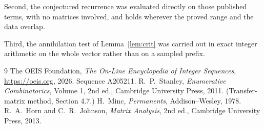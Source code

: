 \documentclass[11pt,a4paper]{article}
\theoremstyle{plain}
\theoremstyle{definition}
\begin{document}
Second, the conjectured recurrence was evaluated directly on those published terms, with no
matrices involved, and holds wherever the proved range and the data overlap.

Third, the annihilation test of Lemma~\ref{lem:crit} was carried out in exact integer
arithmetic on the whole vector rather than on a sampled prefix.

\begin{thebibliography}{9}
 The OEIS Foundation, \emph{The On-Line Encyclopedia of Integer
Sequences}, \url{https://oeis.org}, 2026. Sequence A205211.
 R.~P.~Stanley, \emph{Enumerative Combinatorics}, Volume 1, 2nd ed.,
Cambridge University Press, 2011. (Transfer-matrix method, Section 4.7.)
 H.~Minc, \emph{Permanents}, Addison--Wesley, 1978.
 R.~A.~Horn and C.~R.~Johnson, \emph{Matrix Analysis}, 2nd ed., Cambridge
University Press, 2013.
\end{thebibliography}
\end{document}
